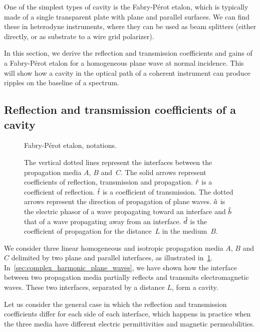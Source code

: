 One of the simplest types of cavity is the Fabry-Pérot etalon, which is typically made of a single transparent plate with plane and parallel surfaces.
We can find these in heterodyne instruments, where they can be used as beam splitters (either directly, or as substrate to a wire grid polarizer).

In this section, we derive the reflection and transmission coefficients and gains of a Fabry-Pérot etalon for a homogeneous plane wave at normal incidence.
This will show how a cavity in the optical path of a coherent instrument can produce ripples on the baseline of a spectrum.




\subsection{Reflection and transmission coefficients of a cavity}

\begin{figure}[hbtp]
    \centering
    
    \caption{Fabry-Pérot etalon, notations.}
    \caption*{
       The vertical dotted lines represent the interfaces between the propagation media $A$, $B$ and~$C$.
       The solid arrows represent coefficients of reflection, transmission and propagation.
       $\hat{r}$ is a coefficient of reflection.
       $\hat{t}$ is a coefficient of transmission.
       The dotted arrows represent the direction of propagation of plane waves.
       $\hat{a}$ is the electric phasor of a wave propagating toward an interface and
       $\hat{b}$ that of a wave propagating away from an interface.
       $\hat{d}$ is the coefficient of propagation for the distance~$L$ in the medium~$B$.
    }
    \label{fig:cavity_notations}
\end{figure}

We consider three linear homogeneous and isotropic propagation media $A$, $B$ and $C$
delimited by two plane and parallel interfaces, as illustrated in~\cref{fig:cavity_notations}.
In~\cref{sec:complex_harmonic_plane_waves}, we have shown how the interface between two propagation media partially reflects and transmits electromagnetic waves.
These two interfaces, separated by a distance $L$, form a cavity.

Let us consider the general case in which the reflection and transmission coefficients differ for each side of each interface,
which happens in practice when the three media have different electric permittivities and magnetic permeabilities.

